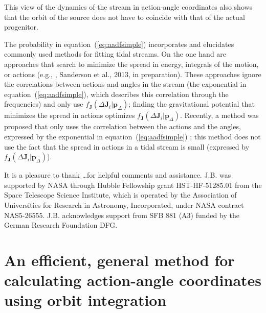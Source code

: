 \documentclass[12pt,preprint]{aastex}
\newcommand{\etal}{et al.}
\newcommand{\eg}{e.g.}
\newcommand{\eqnname}{equation}
\renewcommand{\vec}[1]{\ensuremath{\mathbf{#1}}}
\newcommand{\vecj}{\ensuremath{\vec{J}}}
\newcommand{\paramsdiff}{\ensuremath{\vec{p}_\Delta}}
\begin{document}
This view of the dynamics of the stream in action-angle coordinates
also shows that the orbit of the source does not have to coincide with
that of the actual progenitor. 

The probability in \eqnname~(\ref{eq:aadfsimple}) incorporates and
elucidates commonly used methods for fitting tidal streams. On the one
hand are approaches that search to minimize the spread in energy,
integrals of the motion, or actions (\eg,
\citealt{Binney08a,Penarrubia12a}, Sanderson \etal, 2013, in
preparation). These approaches ignore the correlations between actions
and angles in the stream (the exponential in
\eqnname~(\ref{eq:aadfsimple}), which describes this correlation
through the frequencies) and only use $f_{\vecj}(\Delta
\vecj_i|\paramsdiff)$; finding the gravitational potential that
minimizes the spread in actions optimizes $f_{\vecj}(\Delta
\vecj_i|\paramsdiff)$. Recently, a method was proposed that only uses
the correlation between the actions and the angles, expressed by the
exponential in \eqnname~(\ref{eq:aadfsimple}) \citep{Sanders13b}; this
method does not use the fact that the spread in actions in a tidal
stream is small (expressed by $f_{\vecj}(\Delta
\vecj_i|\paramsdiff)$).



\acknowledgements It is a pleasure to thank \dots for helpful comments
and assistance. J.B. was supported by NASA through Hubble Fellowship
grant HST-HF-51285.01 from the Space Telescope Science Institute,
which is operated by the Association of Universities for Research in
Astronomy, Incorporated, under NASA contract NAS5-26555. J.B.
acknowledges support from SFB 881 (A3) funded by the German Research
Foundation DFG.


\appendix

\section{An efficient, general method for calculating action-angle coordinates using orbit integration}\label{sec:aa}
\end{document}
